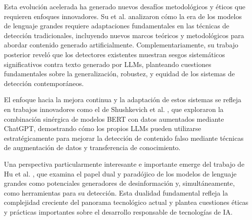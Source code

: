 Esta evolución acelerada ha generado nuevos desafíos metodológicos y éticos que requieren enfoques innovadores. Su et al. \cite{su2023adapting} analizaron cómo la era de los modelos de lenguaje grandes requiere adaptaciones fundamentales en las técnicas de detección tradicionales, incluyendo nuevos marcos teóricos y metodológicos para abordar contenido generado artificialmente. Complementariamente, su trabajo posterior \cite{su2023fake} reveló que los detectores existentes muestran sesgos sistemáticos significativos contra texto generado por LLMs, planteando cuestiones fundamentales sobre la generalización, robustez, y equidad de los sistemas de detección contemporáneos.

El enfoque hacia la mejora continua y la adaptación de estos sistemas se refleja en trabajos innovadores como el de Shushkevich et al. \cite{shushkevich2023improving}, que exploraron la combinación sinérgica de modelos BERT con datos aumentados mediante ChatGPT, demostrando cómo los propios LLMs pueden utilizarse estratégicamente para mejorar la detección de contenido falso mediante técnicas de augmentación de datos y transferencia de conocimiento.

Una perspectiva particularmente interesante e importante emerge del trabajo de Hu et al. \cite{hu2024bad}, que examina el papel dual y paradójico de los modelos de lenguaje grandes como potenciales generadores de desinformación y, simultáneamente, como herramientas para su detección. Esta dualidad fundamental refleja la complejidad creciente del panorama tecnológico actual y plantea cuestiones éticas y prácticas importantes sobre el desarrollo responsable de tecnologías de IA.

